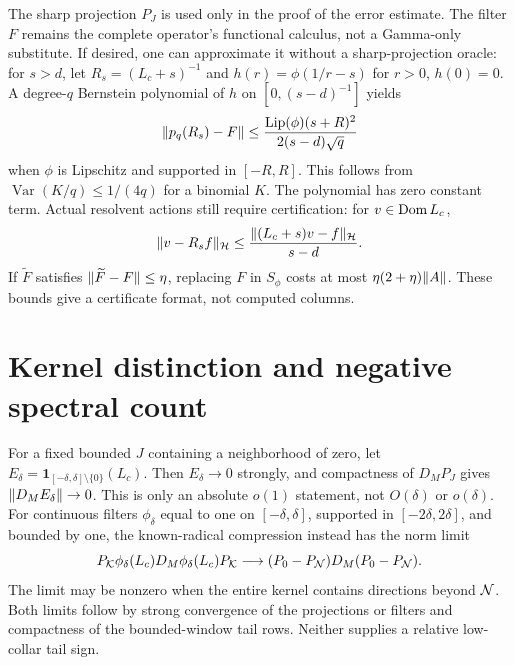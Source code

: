 \documentclass[11pt]{article}
\begin{document}
The sharp projection $P_J$ is used only in the proof of the error estimate. The filter $F$ remains the complete operator's functional calculus, not a Gamma-only substitute. If desired, one can approximate it without a sharp-projection oracle: for $s>d$, let $R_s=(L_c+s)^{-1}$ and $h(r)=\phi(1/r-s)$ for $r>0$, $h(0)=0$. A degree-$q$ Bernstein polynomial of $h$ on $[0,(s-d)^{-1}]$ yields
\begin{equation}\label{bernstein}
 \lVert p_q(R_s)-F\rVert\le \frac{\operatorname{Lip}(\phi)(s+R)^2}{2(s-d)\sqrt q}
\end{equation}
when $\phi$ is Lipschitz and supported in $[-R,R]$. This follows from $\operatorname{Var}(K/q)\le1/(4q)$ for a binomial $K$. The polynomial has zero constant term. Actual resolvent actions still require certification: for $v\in\operatorname{Dom} L_c$,
\[\lVert v-R_sf\rVert_{\mathcal H}\le\frac{\lVert(L_c+s)v-f\rVert_{\mathcal H}}{s-d}.\]
If $\widetilde F$ satisfies $\lVert\widetilde F-F\rVert\le\eta$, replacing $F$ in $S_\phi$ costs at most $\eta(2+\eta)\lVert A\rVert$. These bounds give a certificate format, not computed columns.

\section{Kernel distinction and negative spectral count}\label{sec:count}
For a fixed bounded $J$ containing a neighborhood of zero, let $E_\delta=\mathbf1_{[-\delta,\delta]\setminus\{0\}}(L_c)$. Then $E_\delta\to0$ strongly, and compactness of $D_MP_J$ gives $\lVert D_ME_\delta\rVert\to0$. This is only an absolute $o(1)$ statement, not $O(\delta)$ or $o(\delta)$. For continuous filters $\phi_\delta$ equal to one on $[-\delta,\delta]$, supported in $[-2\delta,2\delta]$, and bounded by one, the known-radical compression instead has the norm limit
\begin{equation}\label{kernel-limit}
 P_\mathcal K\phi_\delta(L_c)D_M\phi_\delta(L_c)P_\mathcal K\longrightarrow(P_0-P_\mathcal N)D_M(P_0-P_\mathcal N).
\end{equation}
The limit may be nonzero when the entire kernel contains directions beyond $\mathcal N$. Both limits follow by strong convergence of the projections or filters and compactness of the bounded-window tail rows. Neither supplies a relative low-collar tail sign.
\end{document}
